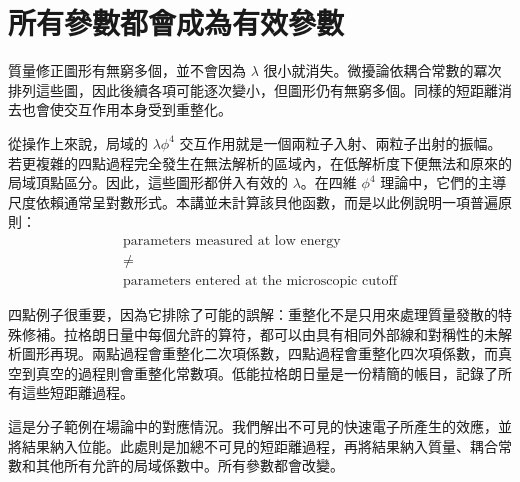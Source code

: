 \section{所有參數都會成為有效參數}

質量修正圖形有無窮多個，並不會因為 \(\lambda\) 很小就消失。微擾論依耦合常數的冪次排列這些圖，因此後續各項可能逐次變小，但圖形仍有無窮多個。同樣的短距離消去也會使交互作用本身受到重整化。

\begin{classroomqa}
\end{classroomqa}

從操作上來說，局域的 \(\lambda\phi^4\) 交互作用就是一個兩粒子入射、兩粒子出射的振幅。若更複雜的四點過程完全發生在無法解析的區域內，在低解析度下便無法和原來的局域頂點區分。因此，這些圖形都併入有效的 \(\lambda\)。在四維 \(\phi^4\) 理論中，它們的主導尺度依賴通常呈對數形式。本講並未計算該貝他函數，而是以此例說明一項普遍原則：
\begin{equation}
\begin{gathered}
\text{parameters measured at low energy}\\
\ne\\
\text{parameters entered at the microscopic cutoff}
\end{gathered}
\end{equation}

四點例子很重要，因為它排除了可能的誤解：重整化不是只用來處理質量發散的特殊修補。拉格朗日量中每個允許的算符，都可以由具有相同外部線和對稱性的未解析圖形再現。兩點過程會重整化二次項係數，四點過程會重整化四次項係數，而真空到真空的過程則會重整化常數項。低能拉格朗日量是一份精簡的帳目，記錄了所有這些短距離過程。

\begin{classroomqa}
\end{classroomqa}

這是分子範例在場論中的對應情況。我們解出不可見的快速電子所產生的效應，並將結果納入位能。此處則是加總不可見的短距離過程，再將結果納入質量、耦合常數和其他所有允許的局域係數中。所有參數都會改變。

